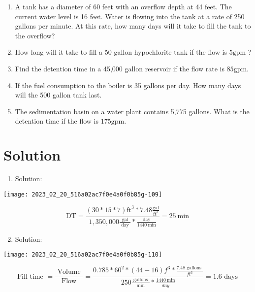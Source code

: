 \documentclass[10pt]{article}
\begin{document}
\begin{enumerate}
\begin{enumerate}
\begin{enumerate}
  \item A tank has a diameter of 60 feet with an overflow depth at 44 feet. The current water level is 16 feet. Water is flowing into the tank at a rate of 250 gallons per minute. At this rate, how many days will it take to fill the tank to the overflow?

  \item How long will it take to fill a 50 gallon hypochlorite tank if the flow is $5 \mathrm{gpm}$ ?

  \item Find the detention time in a 45,000 gallon reservoir if the flow rate is $85 \mathrm{gpm}$.

  \item If the fuel consumption to the boiler is 35 gallons per day. How many days will the 500 gallon tank last.

  \item The sedimentation basin on a water plant contains 5,775 gallons. What is the detention time if the flow is $175 \mathrm{gpm}$.

\end{enumerate}

\section{Solution}
\begin{enumerate}
  \item Solution:
\end{enumerate}

\begin{center}
\texttt{[image: 2023\_02\_20\_516a02ac7f0e4a0f0b85g-109]}
\end{center}

$$
\mathrm{DT}=\frac{(30 * 15 * 7) \mathrm{ft}^{3} * 7.48 \frac{\mathrm{gal}}{\mathrm{ft}^{3}}}{1,350,000 \frac{\mathrm{gal}}{\text { day }} * \frac{\text { day }}{1440 \mathrm{~min}}}=25 \mathrm{~min}
$$

\begin{enumerate}
  \setcounter{enumi}{1}
  \item Solution:
\end{enumerate}

\begin{center}
\texttt{[image: 2023\_02\_20\_516a02ac7f0e4a0f0b85g-110]}
\end{center}

$$
\text { Fill time }=\frac{\text { Volume }}{\text { Flow }}=\frac{0.785 * 60^{2} *(44-16) f^{3} * \frac{7.48 \text { gallons }}{f t^{3}}}{250 \frac{\text { gallons }}{\mathrm{min}} * \frac{1440 \mathrm{~min}}{d a y}}=1.6 \text { days }
$$


\end{enumerate}
\end{enumerate}
\end{document}
